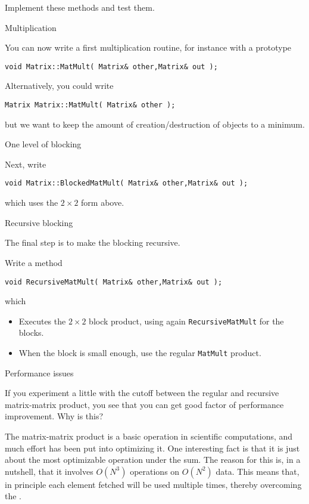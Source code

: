 \begin{exercise}
  Implement these methods and test them.
\end{exercise}

 {Multiplication}

You can now write a first multiplication routine, for instance with a prototype
\begin{lstlisting}
void Matrix::MatMult( Matrix& other,Matrix& out );
\end{lstlisting}

Alternatively, you could write
\begin{lstlisting}
Matrix Matrix::MatMult( Matrix& other );
\end{lstlisting}
but we want to keep the amount of creation/destruction of objects to a minimum.

 {One level of blocking}

Next, write
\begin{lstlisting}
void Matrix::BlockedMatMult( Matrix& other,Matrix& out );
\end{lstlisting}
which uses the $2\times2$ form above.

 {Recursive blocking}

The final step is to make the blocking recursive.

\begin{exercise}
  Write a method
\begin{lstlisting}
void RecursiveMatMult( Matrix& other,Matrix& out );
\end{lstlisting}
  which 
  \begin{itemize}
  \item Executes the $2\times2$ block product, using again
    \lstinline{RecursiveMatMult} for the blocks.
  \item When the block is small enough, use the regular
    \lstinline{MatMult} product.
  \end{itemize}
\end{exercise}

 {Performance issues}

If you experiment a little with the cutoff between the regular and
recursive matrix-matrix product, you see that you can get good factor
of performance improvement. Why is this?

The matrix-matrix product is a basic operation in scientific
computations, and much effort has been put into optimizing it. One
interesting fact is that it is just about the most optimizable
operation under the sum. The reason for this is, in a nutshell, that
it involves $O(N^3)$ operations on $O(N^2)$ data. This means that, in
principle each element fetched will be used multiple times, thereby
overcoming the .

